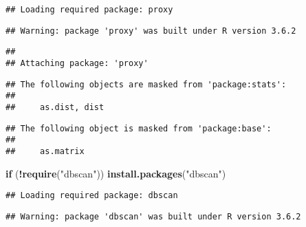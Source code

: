 \documentclass[]{article}
\newenvironment{Shaded}{\begin{snugshade}}{\end{snugshade}}
\newcommand{\ControlFlowTok}[1]{\textcolor[rgb]{0.13,0.29,0.53}{\textbf{#1}}}
\newcommand{\DataTypeTok}[1]{\textcolor[rgb]{0.13,0.29,0.53}{#1}}
\newcommand{\DecValTok}[1]{\textcolor[rgb]{0.00,0.00,0.81}{#1}}
\newcommand{\FloatTok}[1]{\textcolor[rgb]{0.00,0.00,0.81}{#1}}
\newcommand{\KeywordTok}[1]{\textcolor[rgb]{0.13,0.29,0.53}{\textbf{#1}}}
\newcommand{\NormalTok}[1]{#1}
\newcommand{\OperatorTok}[1]{\textcolor[rgb]{0.81,0.36,0.00}{\textbf{#1}}}
\newcommand{\StringTok}[1]{\textcolor[rgb]{0.31,0.60,0.02}{#1}}
\begin{document}
\begin{verbatim}
## Loading required package: proxy
\end{verbatim}

\begin{verbatim}
## Warning: package 'proxy' was built under R version 3.6.2
\end{verbatim}

\begin{verbatim}
## 
## Attaching package: 'proxy'
\end{verbatim}

\begin{verbatim}
## The following objects are masked from 'package:stats':
## 
##     as.dist, dist
\end{verbatim}

\begin{verbatim}
## The following object is masked from 'package:base':
## 
##     as.matrix
\end{verbatim}

\begin{Shaded}
\begin{Highlighting}[]
\ControlFlowTok{if}\NormalTok{ (}\OperatorTok{!}\KeywordTok{require}\NormalTok{(}\StringTok{"dbscan"}\NormalTok{)) }\KeywordTok{install.packages}\NormalTok{(}\StringTok{"dbscan"}\NormalTok{)}
\end{Highlighting}
\end{Shaded}

\begin{verbatim}
## Loading required package: dbscan
\end{verbatim}

\begin{verbatim}
## Warning: package 'dbscan' was built under R version 3.6.2
\end{verbatim}

\begin{Shaded}
\end{Shaded}
\end{document}
